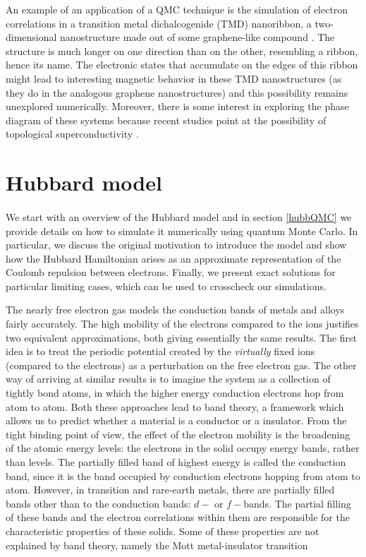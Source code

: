 An example of an application of a QMC technique is the simulation of electron correlations in a transition metal dichalcogenide (TMD) nanoribbon, a two-dimensional nanostructure made out of some graphene-like compound \cite{Yang2017, Raczkowski2017, Chen2017, Wang2012, Braz2017}. The structure is much longer on one direction than on the other, resembling a ribbon, hence its name. The electronic states that accumulate on the edges of this ribbon might lead to interesting magnetic behavior in these TMD nanostructures (as they do in the analogous graphene nanostructures\cite{Yazyev2010}) and this possibility remains unexplored numerically\cite{Feldner2011, Golor2013}. Moreover, there is some interest in exploring the phase diagram of these systems because recent studies point at the possibility of topological superconductivity \cite{Hsu2017}.

\section{Hubbard model}\paragraph{}

We start with an overview of the Hubbard model and in section \ref{hubbQMC} we provide details on how to simulate it numerically using quantum Monte Carlo. In particular, we discuss the original motivation to introduce the model and show how the Hubbard Hamiltonian arises as an approximate representation of the Coulomb repulsion between electrons. Finally, we present exact solutions for particular limiting cases, which can be used to crosscheck our simulations.

The nearly free electron gas models the conduction bands of metals and alloys fairly accurately. The high mobility of the electrons compared to the ions justifies two equivalent approximations, both giving essentially the same results\cite{Ashcroft1976}. The first idea is to treat the periodic potential created by the \emph{virtually} fixed ions (compared to the electrons) as a perturbation on the free electron gas. The other way of arriving at similar results is to imagine the system as a collection of tightly bond atoms, in which the higher energy conduction electrons hop from atom to atom. Both these approaches lead to band theory, a framework which allows us to predict whether a material is a conductor or a insulator. From the tight binding point of view, the effect of the electron mobility is the broadening of the atomic energy levels: the electrons in the solid occupy energy bands, rather than levels. The partially filled band of highest energy is called the conduction band, since it is the band occupied by conduction electrons hopping from atom to atom. However, in transition and rare-earth metals, there are partially filled bands other than to the conduction bands: $d-$ or $f-$bands. The partial filling of these bands and the electron correlations within them are responsible for the characteristic properties of these solids. Some of these properties are not explained by band theory, namely the Mott metal-insulator transition\cite{Boer1937, Mott1939, Mott1949}

